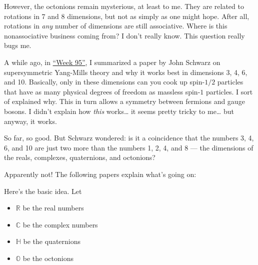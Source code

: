 \documentclass{article}
\def\tightlist{}
\renewcommand{\texttt}[1]{%
  \begingroup
  \ttfamily
  \begingroup\lccode`~=`/\lowercase{\endgroup\def~}{/\discretionary{}{}{}}%
  \begingroup\lccode`~=`[\lowercase{\endgroup\def~}{[\discretionary{}{}{}}%
  \begingroup\lccode`~=`.\lowercase{\endgroup\def~}{.\discretionary{}{}{}}%
  \catcode`/=\active\catcode`[=\active\catcode`.=\active
  \scantokens{#1\noexpand}%
  \endgroup
}
\begin{document}
However, the octonions remain mysterious, at least to me. They are
related to rotations in 7 and 8 dimensions, but not as simply as one
might hope. After all, rotations in \emph{any} number of dimensions are
still associative. Where is this nonassociative business coming from? I
don't really know. This question really bugs me.

A while ago, in \protect\hyperlink{week95}{``Week 95''}, I summarized a
paper by John Schwarz on supersymmetric Yang-Mills theory and why it
works best in dimensions 3, 4, 6, and 10. Basically, only in these
dimensions can you cook up spin-\(1/2\) particles that have as many
physical degrees of freedom as massless spin-\(1\) particles. I sort of
explained why. This in turn allows a symmetry between fermions and gauge
bosons. I didn't explain how \emph{this} works\ldots{} it seems pretty
tricky to me\ldots{} but anyway, it works.

So far, so good. But Schwarz wondered: is it a coincidence that the
numbers 3, 4, 6, and 10 are just two more than the numbers 1, 2, 4, and
8 --- the dimensions of the reals, complexes, quaternions, and
octonions?

Apparently not! The following papers explain what's going on:


Here's the basic idea. Let

\begin{itemize}
\tightlist
\item
  \(\mathbb{R}\) be the real numbers
\item
  \(\mathbb{C}\) be the complex numbers
\item
  \(\mathbb{H}\) be the quaternions
\item
  \(\mathbb{O}\) be the octonions
\end{itemize}
\end{document}
